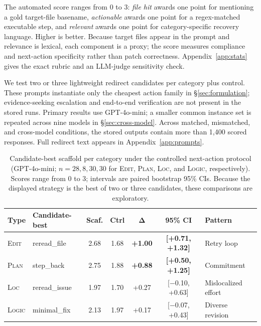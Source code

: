 \documentclass{article}
\begin{document}
The automated score ranges from 0 to 3: \emph{file hit} awards one point for
mentioning a gold target-file basename, \emph{actionable} awards one point for a
regex-matched executable step, and \emph{relevant} awards one point for
category-specific recovery language.  Higher is better.  Because target files
appear in the prompt and relevance is lexical, each component is a proxy; the
score measures compliance and next-action specificity rather than patch
correctness.  Appendix~\ref{app:stats} gives the exact rubric and an LLM-judge
sensitivity check.

We test two or three lightweight redirect candidates per category plus control.
These prompts instantiate only the cheapest action family in
\S\ref{sec:formulation}; evidence-seeking escalation and end-to-end verification
are not present in the stored runs.  Primary results use GPT-4o-mini; a smaller
common instance set is repeated across nine models in
\S\ref{sec:cross-model}.  Across matched, mismatched, and cross-model conditions,
the stored outputs contain more than 1,400 scored responses.  Full redirect text
appears in Appendix~\ref{app:prompts}.

\begin{table}[H]
\centering
\small
\setlength{\tabcolsep}{3.5pt}
\begin{tabular}{@{}llccccl@{}}
\toprule
\textbf{Type} & \textbf{Candidate-best} & \textbf{Scaf.} & \textbf{Ctrl} & $\boldsymbol{\Delta}$ & \textbf{95\% CI} & \textbf{Pattern} \\
\midrule
\textsc{Edit} & reread\_file & 2.68 & 1.68 & \textbf{+1.00} & \textbf{[+0.71, +1.32]} & Retry loop \\
\textsc{Plan} & step\_back & 2.75 & 1.88 & \textbf{+0.88} & \textbf{[+0.50, +1.25]} & Commitment \\
\textsc{Loc} & reread\_issue & 1.97 & 1.70 & +0.27 & [$-$0.10, +0.63] & Mislocalized effort \\
\textsc{Logic} & minimal\_fix & 2.13 & 1.97 & +0.17 & [$-$0.07, +0.43] & Diverse revision \\
\bottomrule
\end{tabular}
\caption{Candidate-best scaffold per category under the controlled
next-action protocol (GPT-4o-mini; $n=28,8,30,30$ for \textsc{Edit},
\textsc{Plan}, \textsc{Loc}, and \textsc{Logic}, respectively).  Scores range from 0 to 3;
intervals are paired bootstrap 95\% CIs.  Because the displayed strategy is the
best of two or three candidates, these comparisons are exploratory.}
\label{tab:scaffold-main}
\end{table}
\end{document}
